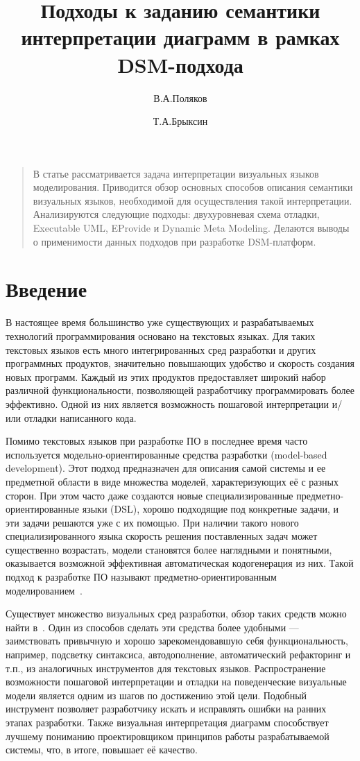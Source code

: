 \documentclass[a5paper]{article}
\title{Подходы к заданию семантики интерпретации диаграмм в рамках DSM-подхода}
\author{В.А.Поляков \and Т.А.Брыксин}
\date{}
\begin{document}
\maketitle
\thispagestyle{empty}

\begin{quote}
\small\noindent
В статье рассматривается задача интерпретации визуальных языков моделирования. Приводится обзор основных способов описания семантики визуальных языков, необходимой для осуществления такой интерпретации. Анализируются следующие подходы: двухуровневая схема отладки, Executable UML, EProvide и Dynamic Meta Modeling. Делаются выводы о применимости данных подходов при разработке DSM-платформ.
\end{quote}

\section*{Введение}

В настоящее время большинство уже существующих и разрабатываемых технологий программирования основано на текстовых языках. Для таких текстовых языков есть много интегрированных сред разработки и других программных продуктов, значительно повышающих удобство и скорость создания новых программ. Каждый из этих продуктов предоставляет широкий набор различной функциональности, позволяющей разработчику программировать более эффективно. Одной из них является возможность пошаговой интерпретации и/или отладки написанного кода.

Помимо текстовых языков при разработке ПО в последнее время часто используется модельно-ориентированные средства разработки (model-based development). Этот подход предназначен для описания самой системы и ее предметной области в виде множества моделей, характеризующих её с разных сторон. При этом часто даже создаются новые специализированные предметно-ориентированные языки (DSL), хорошо подходящие под конкретные задачи, и эти задачи решаются уже с их помощью. При наличии такого нового специализированного языка скорость решения поставленных задач может существенно возрастать, модели становятся более наглядными и понятными, оказывается возможной эффективная автоматическая кодогенерация из них. Такой подход к разработке ПО называют предметно-ориентированным моделированием~\cite{koznov1, koznov2, koznov4, koznov6, dsmbook}.

Существует множество визуальных сред разработки, обзор таких средств можно найти в~\cite{koznov3, koznov5}. Один из способов сделать эти средства более удобными — заимствовать привычную и хорошо зарекомендовавшую себя функциональность, например, подсветку синтаксиса, автодополнение, автоматический рефакторинг и т.п., из аналогичных инструментов для текстовых языков. Распространение возможности пошаговой интерпретации и отладки на поведенческие визуальные модели является одним из шагов по достижению этой цели. Подобный инструмент позволяет разработчику искать и исправлять ошибки на ранних этапах разработки. Также визуальная интерпретация диаграмм способствует лучшему пониманию проектировщиком принципов работы разрабатываемой системы, что, в итоге, повышает её качество.
\end{document}

